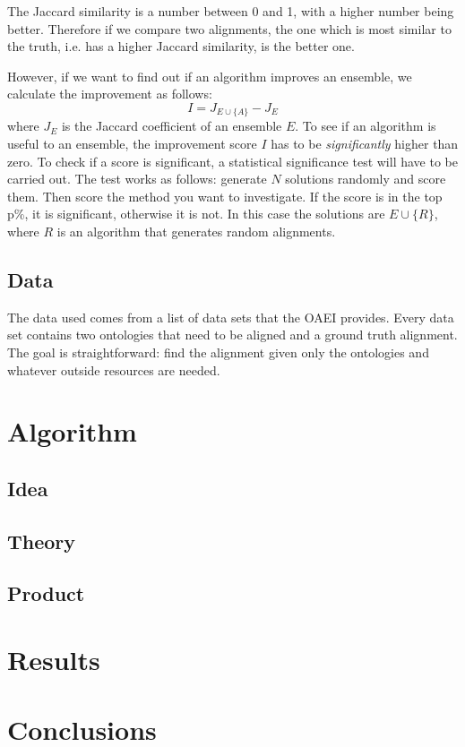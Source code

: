 \documentclass{article}
\begin{document}
 The Jaccard similarity is a number between 0 and 1, with a higher number being better. Therefore if we compare two alignments, the one which is most similar to the truth, i.e. has a higher Jaccard similarity, is the better one.
 
 However, if we want to find out if an algorithm improves an ensemble, we calculate the improvement as follows:
 \[
 I = J_{E\cup \{A\}} - J_E
 \]
 where $J_E$ is the Jaccard coefficient of an ensemble $E$.
 To see if an algorithm is useful to an ensemble, the improvement score $I$ has to be \emph{significantly} higher than zero. To check if a score is significant, a statistical significance test will have to be carried out. The test works as follows: generate $N$ solutions randomly and score them. Then score the method you want to investigate. If the score is in the top p\%, it is significant, otherwise it is not. In this case the solutions are $E\cup \{R\}$, where $R$ is an algorithm that generates random alignments.
 \subsection{Data}
 The data used comes from a list of data sets that the OAEI provides. %
 Every data set contains two ontologies that need to be aligned and a ground truth alignment. The goal is straightforward: find the alignment given only the ontologies and whatever outside resources are needed.
 \section{Algorithm}
 \subsection{Idea}
 \subsection{Theory}
 \subsection{Product}
 
 \section{Results}
 
 \section{Conclusions}
\end{document}
